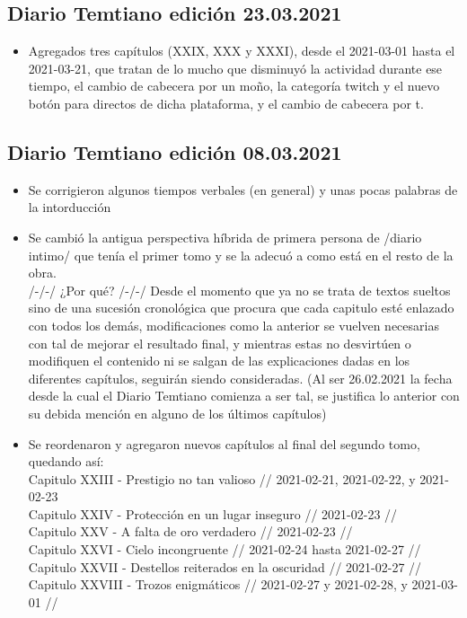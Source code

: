 \documentclass[
]{book}
\providecommand{\tightlist}{%
  \setlength{\itemsep}{0pt}\setlength{\parskip}{0pt}}
\begin{document}
\hypertarget{diario-temtiano-ediciuxf3n-23.03.2021}{%
\subsection*{Diario Temtiano edición 23.03.2021}\label{diario-temtiano-ediciuxf3n-23.03.2021}}

\begin{itemize}
\tightlist
\item[$\boxtimes$]
  Agregados tres capítulos (XXIX, XXX y XXXI), desde el 2021-03-01 hasta el 2021-03-21, que tratan de lo mucho que disminuyó la actividad durante ese tiempo, el cambio de cabecera por un moño, la categoría twitch y el nuevo botón para directos de dicha plataforma, y el cambio de cabecera por t.
\end{itemize}

\hypertarget{diario-temtiano-ediciuxf3n-08.03.2021}{%
\subsection*{Diario Temtiano edición 08.03.2021}\label{diario-temtiano-ediciuxf3n-08.03.2021}}

\begin{itemize}
\item
  Se corrigieron algunos tiempos verbales (en general) y unas pocas palabras de la intorducción
\item
  Se cambió la antigua perspectiva híbrida de primera persona de /diario intimo/ que tenía el primer tomo y se la adecuó a como está en el resto de la obra.~\\
  /-/-/ ¿Por qué? /-/-/ Desde el momento que ya no se trata de textos sueltos sino de una sucesión cronológica que procura que cada capitulo esté enlazado con todos los demás, modificaciones como la anterior se vuelven necesarias con tal de mejorar el resultado final, y mientras estas no desvirtúen o modifiquen el contenido ni se salgan de las explicaciones dadas en los diferentes capítulos, seguirán siendo consideradas. (Al ser 26.02.2021 la fecha desde la cual el Diario Temtiano comienza a ser tal, se justifica lo anterior con su debida mención en alguno de los últimos capítulos)
\item
  Se reordenaron y agregaron nuevos capítulos al final del segundo tomo, quedando así:~\\
  Capitulo XXIII - Prestigio no tan valioso // 2021-02-21, 2021-02-22, y 2021-02-23~\\
  Capitulo XXIV - Protección en un lugar inseguro // 2021-02-23 //~\\
  Capitulo XXV - A falta de oro verdadero // 2021-02-23 //~\\
  Capitulo XXVI - Cielo incongruente // 2021-02-24 hasta 2021-02-27 //~\\
  Capitulo XXVII - Destellos reiterados en la oscuridad // 2021-02-27 //~\\
  Capitulo XXVIII - Trozos enigmáticos // 2021-02-27 y 2021-02-28, y 2021-03-01 //
\end{itemize}
\end{document}
